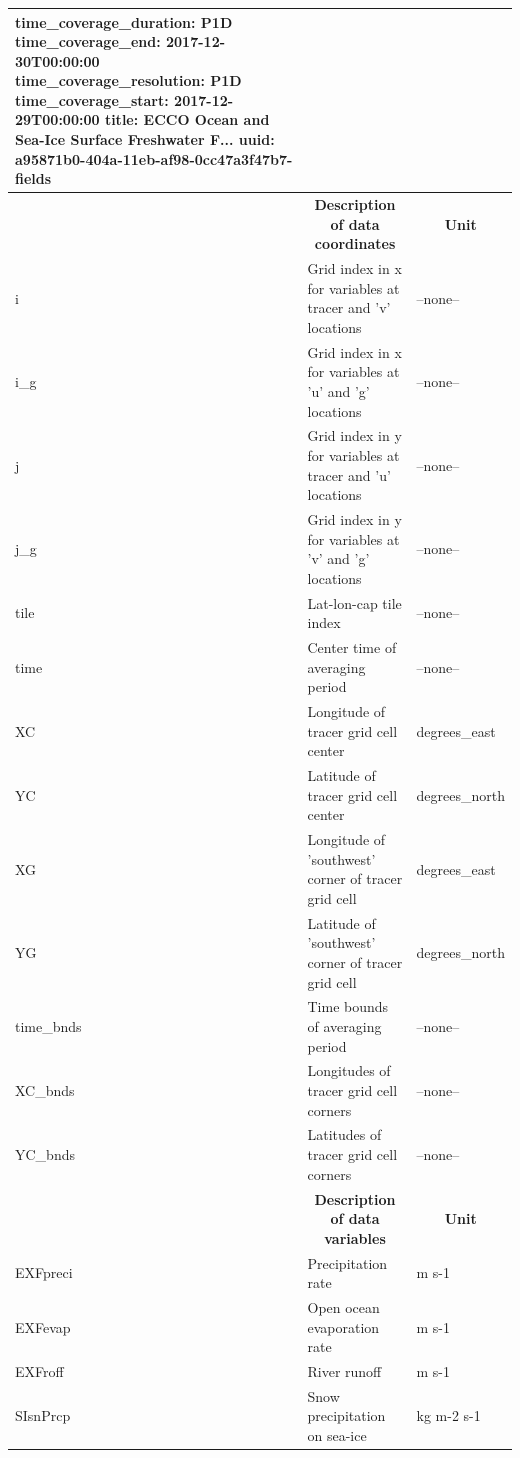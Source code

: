 \begin{longtable}{|m{}|m{}|m{}|}
{    time_coverage_duration:       P1D
    time_coverage_end:            2017-12-30T00:00:00
    time_coverage_resolution:     P1D
    time_coverage_start:          2017-12-29T00:00:00
    title:                        ECCO Ocean and Sea-Ice Surface Freshwater F...
    uuid:                         a95871b0-404a-11eb-af98-0cc47a3f47b7-fields} \\ 
\hline \endhead \hline \endfoot
\rowcolor{lightgray} \multicolumn{1}{|c|}{\textbf{Coordinates}} & \multicolumn{1}{|c|}{\textbf{Description of data coordinates}} &  \multicolumn{1}{|c|}{\textbf{Unit}}\\ \hline
i &Grid index in x for variables at tracer and 'v' locations &--none--  \\ \hline
i\_g &Grid index in x for variables at 'u' and 'g' locations &--none--  \\ \hline
j &Grid index in y for variables at tracer and 'u' locations &--none--  \\ \hline
j\_g &Grid index in y for variables at 'v' and 'g' locations &--none--  \\ \hline
tile &Lat-lon-cap tile index &--none--  \\ \hline
time &Center time of averaging period &--none--  \\ \hline
XC &Longitude of tracer grid cell center &degrees\_east  \\ \hline
YC &Latitude of tracer grid cell center &degrees\_north  \\ \hline
XG &Longitude of 'southwest' corner of tracer grid cell &degrees\_east  \\ \hline
YG &Latitude of 'southwest' corner of tracer grid cell &degrees\_north  \\ \hline
time\_bnds &Time bounds of averaging period &--none--  \\ \hline
XC\_bnds &Longitudes of tracer grid cell corners &--none--  \\ \hline
YC\_bnds &Latitudes of tracer grid cell corners &--none--  \\ \hline
\rowcolor{lightgray} \multicolumn{1}{|c|}{\textbf{Variables}} & \multicolumn{1}{|c|}{\textbf{Description of data variables}} &  \multicolumn{1}{|c|}{\textbf{Unit}}\\ \hline
EXFpreci &Precipitation rate &m s-1  \\ \hline
EXFevap &Open ocean evaporation rate &m s-1  \\ \hline
EXFroff &River runoff &m s-1  \\ \hline
SIsnPrcp &Snow precipitation on sea-ice &kg m-2 s-1  \\ \hline

\end{longtable}
